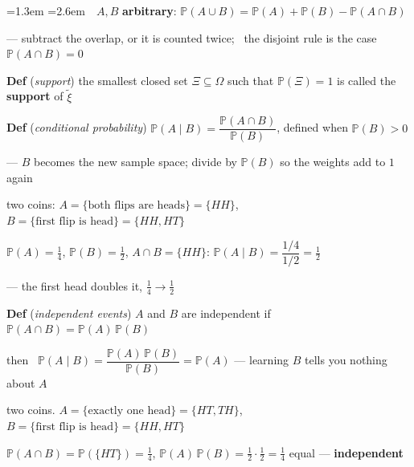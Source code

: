 \documentclass[10pt]{article}
\newenvironment{board}{%
  \par\vspace{4pt}
  \begingroup\leftskip=1.3em\relax\parskip=2pt\relax}{%
  \par\endgroup\vspace{4pt}}
\newcommand{\bul}{\hangindent=2.6em\hangafter=1\hspace{1.2em}\textbullet\ \ignorespaces}
\begin{document}
\begin{board}
\bul \ $A, B$ \textbf{arbitrary}: \qquad $\mathbb{P}(A \cup B) = \mathbb{P}(A) + \mathbb{P}(B) - \mathbb{P}(A \cap B)$
\vspace{2pt}

\qquad --- subtract the overlap, or it is counted twice; \ the disjoint rule is the case $\mathbb{P}(A \cap B) = 0$
\vspace{12pt}

\textbf{Def} (\emph{support}) \quad the smallest closed set $\Xi \subseteq \Omega$ such that
$\mathbb{P}(\Xi) = 1$ is called the \textbf{support} of $\tilde\xi$
\vspace{14pt}

\textbf{Def} (\emph{conditional probability}) \quad
$\mathbb{P}(A \mid B) = \dfrac{\mathbb{P}(A \cap B)}{\mathbb{P}(B)}$, \qquad defined when $\mathbb{P}(B) > 0$
\vspace{3pt}

\quad --- $B$ becomes the new sample space; divide by $\mathbb{P}(B)$ so the weights add to $1$ again
\vspace{8pt}

\quad two coins: \quad $A = \{\text{both flips are heads}\} = \{HH\}$, \qquad $B = \{\text{first flip is head}\} = \{HH, HT\}$
\vspace{3pt}

\quad $\mathbb{P}(A) = \tfrac14$, \quad $\mathbb{P}(B) = \tfrac12$, \quad $A \cap B = \{HH\}$:
\qquad $\mathbb{P}(A \mid B) = \dfrac{1/4}{1/2} = \tfrac12$
\vspace{3pt}

\quad --- the first head doubles it, $\tfrac14 \to \tfrac12$
\vspace{10pt}

\textbf{Def} (\emph{independent events}) \quad $A$ and $B$ are independent if \quad $\mathbb{P}(A \cap B) = \mathbb{P}(A)\,\mathbb{P}(B)$
\vspace{3pt}

\quad then \ $\mathbb{P}(A \mid B) = \dfrac{\mathbb{P}(A)\,\mathbb{P}(B)}{\mathbb{P}(B)} = \mathbb{P}(A)$ \quad --- learning $B$ tells you nothing about $A$
\vspace{8pt}

\quad two coins. \quad $A = \{\text{exactly one head}\} = \{HT, TH\}$, \qquad
      $B = \{\text{first flip is head}\} = \{HH, HT\}$
\vspace{3pt}

\quad $\mathbb{P}(A \cap B) = \mathbb{P}(\{HT\}) = \tfrac14$, \qquad
      $\mathbb{P}(A)\,\mathbb{P}(B) = \tfrac12 \cdot \tfrac12 = \tfrac14$
\qquad equal --- \textbf{independent}
\vspace{3pt}


\end{board}
\end{document}

